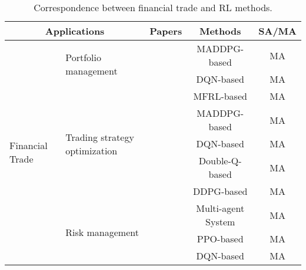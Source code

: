 \documentclass[acmsmall]{acmart}
\begin{document}
\begin{table}[]
\centering
\caption{Correspondence between financial trade and RL methods.}
\label{trade}
\begin{tabularx}{\textwidth}{|XX|c|c|c|}
\hline
\multicolumn{2}{|c|}{Applications}                                                                       & Papers                                              & Methods                            & SA/MA \\ \hline
\multicolumn{1}{|X|}{\multirow{10}{=}{\centering Financial Trade}} & \multirow{2}{=}{\centering Portfolio management}          & \cite{Pham2021,Ma2023}                              & MADDPG-based \cite{maddpg}         & MA    \\ \cline{3-5} 
\multicolumn{1}{|X|}{}                                  &                                                & \cite{lee2020maps,huang2022mspm,SHAVANDI2022118124} & DQN-based \cite{dqn}               & MA    \\ \cline{2-5} 
\multicolumn{1}{|X|}{}                                  & \multirow{5}{=}{\centering Trading strategy optimization} & \cite{9931995}                                      & MFRL-based \cite{pmlr-v80-yang18d} & MA    \\ \cline{3-5} 
\multicolumn{1}{|X|}{}                                  &                                                & \cite{qiu2021multi}                                 & MADDPG-based \cite{maddpg}         & MA    \\ \cline{3-5} 
\multicolumn{1}{|X|}{}                                  &                                                & \cite{patel2018optimizing}                          & DQN-based \cite{dqn}               & MA    \\ \cline{3-5} 
\multicolumn{1}{|X|}{}                                  &                                                & \cite{10.1145/3383455.3422570}                      & Double-Q-based \cite{doubleq}      & MA    \\ \cline{3-5} 
\multicolumn{1}{|X|}{}                                  &                                                & \cite{bao2019fairness}                              & DDPG-based \cite{ddpg}             & MA    \\ \cline{2-5} 
\multicolumn{1}{|X|}{}                                  & \multirow{3}{=}{\centering Risk management}               &  \cite{BAJO20126921}                     & Multi-agent System                 & MA    \\ \cline{3-5} 
\multicolumn{1}{|X|}{}                                  &                                                & \cite{ganesh2019reinforcement}                      & PPO-based \cite{ppo}               & MA    \\ \cline{3-5} 
\multicolumn{1}{|X|}{}                                  &                                                & \cite{HE2023109985}                                 & DQN-based \cite{dqn}               & MA    \\ \hline
\end{tabularx}
\end{table}
\end{document}

